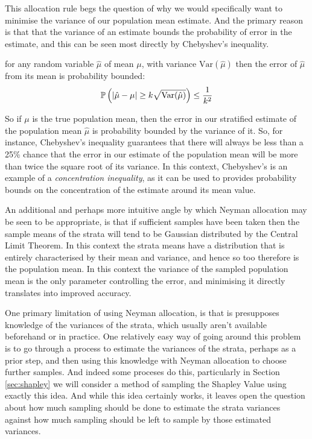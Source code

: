 This allocation rule begs the question of why we would specifically want to minimise the variance of our population mean estimate.
And the primary reason is that that the variance of an estimate bounds the probability of error in the estimate, and this can be seen most directly by Chebyshev's inequality.

\begin{theorem}\label{thm:chebyshevs}
for any random variable $\hat{\mu}$ of mean $\mu$, with variance $\text{Var}(\hat{\mu})$ then the error of $\hat{\mu}$ from its mean is probability bounded:
$$ \operatorname{\mathbb{P}}\left(|\hat{\mu}-\mu|\ge k\sqrt{\text{Var}(\hat{\mu})}\right)\le\frac{1}{k^2} $$
\end{theorem}

So if $\mu$ is the true population mean, then the error in our stratified estimate of the population mean $\hat{\mu}$ is probability bounded by the variance of it.
So, for instance, Chebyshev's inequality guarantees that there will always be less than a 25\% chance that the error in our estimate of the population mean will be more than twice the square root of its variance.
In this context, Chebyshev's is an example of a \textit{concentration inequality}, as it can be used to provides probability bounds on the concentration of the estimate around its mean value.

An additional and perhaps more intuitive angle by which Neyman allocation may be seen to be appropriate, is that if sufficient samples have been taken then the sample means of the strata will tend to be Gaussian distributed by the Central Limit Theorem.
In this context the strata means have a distribution that is entirely characterised by their mean and variance, and hence so too therefore is the population mean.
In this context the variance of the sampled population mean is the only parameter controlling the error, and minimising it directly translates into improved accuracy.

One primary limitation of using Neyman allocation, is that is presupposes knowledge of the variances of the strata, which usually aren't available beforehand or in practice.
One relatively easy way of going around this problem is to go through a process to estimate the variances of the strata, perhaps as a prior step, and then using this knowledge with Neyman allocation to choose further samples.
And indeed some proceses do this, particularly in Section \ref{sec:shapley} we will consider a method of sampling the Shapley Value using exactly this idea.
And while this idea certainly works, it leaves open the question about how much sampling should be done to estimate the strata variances against how much sampling should be left to sample by those estimated variances.

